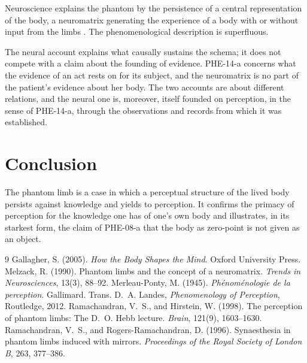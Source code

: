 \documentclass{situationist-preprint}
\begin{document}
\begin{objection}
Neuroscience explains the phantom by the persistence of a central representation of the body, a neuromatrix generating the experience of a body with or without input from the limbs \citep{Melzack1990}. The phenomenological description is superfluous.
\end{objection}

\begin{reply}
The neural account explains what causally sustains the schema; it does not compete with a claim about the founding of evidence. PHE-14-a concerns what the evidence of an act rests on for its subject, and the neuromatrix is no part of the patient's evidence about her body. The two accounts are about different relations, and the neural one is, moreover, itself founded on perception, in the sense of PHE-14-a, through the observations and records from which it was established.
\end{reply}

\section{Conclusion}

The phantom limb is a case in which a perceptual structure of the lived body persists against knowledge and yields to perception. It confirms the primacy of perception for the knowledge one has of one's own body and illustrates, in its starkest form, the claim of PHE-08-a that the body as zero-point is not given as an object.

\begin{thebibliography}{9}\small
{} Gallagher, S. (2005). \emph{How the Body Shapes the Mind}. Oxford University Press.
 Melzack, R. (1990). Phantom limbs and the concept of a neuromatrix. \emph{Trends in Neurosciences}, 13(3), 88--92.
 Merleau-Ponty, M. (1945). \emph{Ph\'enom\'enologie de la perception}. Gallimard. Trans. D.~A. Landes, \emph{Phenomenology of Perception}, Routledge, 2012.
 Ramachandran, V.~S., and Hirstein, W. (1998). The perception of phantom limbs: The D.~O. Hebb lecture. \emph{Brain}, 121(9), 1603--1630.
 Ramachandran, V.~S., and Rogers-Ramachandran, D. (1996). Synaesthesia in phantom limbs induced with mirrors. \emph{Proceedings of the Royal Society of London B}, 263, 377--386.
\end{thebibliography}
\end{document}
